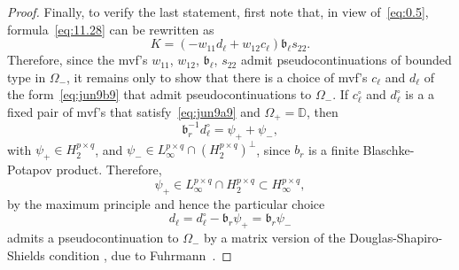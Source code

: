 \documentclass[12pt,twoside,a4paper]{amsart}
\theoremstyle{definition}
\numberwithin{equation}{section}
\begin{document}
\begin{proof}
Finally, to verify the last statement, first note that, in view
of~\eqref{eq:0.5},
formula~\eqref{eq:11.28} can be rewritten as
\[
K=(-w_{11}d_\ell+w_{12}c_\ell){{\mathfrak b}}_\ell s_{22}.
\]
Therefore, since the
mvf's $w_{11}$, $w_{12}$, ${{\mathfrak b}}_\ell$, $ s_{22}$  admit
pseudocontinuations of bounded type in $\Omega_-$, it remains only to show
that there is a choice of mvf's $c_\ell$ and $d_\ell$ of the
form~\eqref{eq:jun9b9} that admit
pseudocontinuations to $\Omega_-$. If $c_\ell^\circ$ and
$d_\ell^\circ$ is a a fixed pair of mvf's that
satisfy~\eqref{eq:jun9a9} and $\Omega_+={{\mathbb D}}$, then
\[
{{\mathfrak b}}_r^{-1}d_\ell^\circ=\psi_++\psi_-,
\]
with $\psi_+\in
H_2^{p\times q}$, and $\psi_-\in L_\infty^{p\times q}\cap(H_2^{p\times q})^\perp$, since
$b_r$ is a finite Blaschke-Potapov product.
Therefore,
\[
\psi_+\in L_\infty^{p\times q}\cap H_2^{p\times q}\subset H_\infty^{p\times q},
\]
by the maximum principle and hence the particular choice
\[
d_\ell=d_\ell^\circ-{{\mathfrak b}}_r\psi_+={{\mathfrak b}}_r\psi_-
\]
admits a pseudocontinuation to $\Omega_-$
by a matrix version of the Douglas-Shapiro-Shields condition \cite{DSS},
due to Fuhrmann~\cite[Theorem 1]{Fuhr74}.
\end{proof}
\end{document}
